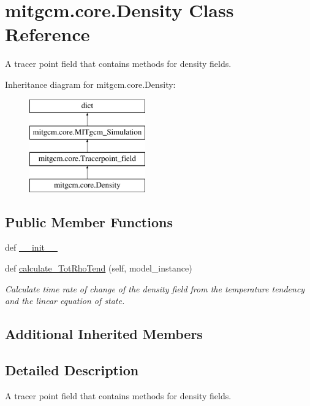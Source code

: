 \hypertarget{classmitgcm_1_1core_1_1Density}{}\section{mitgcm.\+core.\+Density Class Reference}
\label{classmitgcm_1_1core_1_1Density}


A tracer point field that contains methods for density fields.  


Inheritance diagram for mitgcm.\+core.\+Density\+:\begin{figure}[H]
\begin{center}
\leavevmode
\includegraphics[height=4.000000cm]{classmitgcm_1_1core_1_1Density}
\end{center}
\end{figure}
\subsection*{Public Member Functions}
\begin{DoxyCompactItemize}
\item 
def \hyperlink{classmitgcm_1_1core_1_1Density_ac4f90f6a9c4a9fe9608b5bfdcb09a47c}{\+\_\+\+\_\+init\+\_\+\+\_\+}
\item 
def \hyperlink{classmitgcm_1_1core_1_1Density_ace1f408672554eb3871856cb8934aaa0}{calculate\+\_\+\+Tot\+Rho\+Tend} (self, model\+\_\+instance)
\begin{DoxyCompactList}\small\item\em Calculate time rate of change of the density field from the temperature tendency and the linear equation of state. \end{DoxyCompactList}\end{DoxyCompactItemize}
\subsection*{Additional Inherited Members}


\subsection{Detailed Description}
A tracer point field that contains methods for density fields. 

